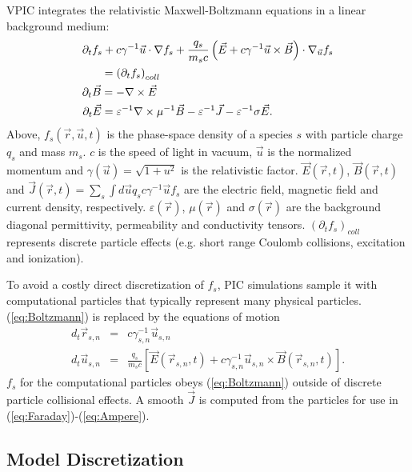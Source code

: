 \documentclass[journal,twoside]{IEEEtran}
\newcommand{\eps}{\varepsilon}
\newcommand{\vecr}{\vec{r}}
\newcommand{\vecu}{\vec{u}}
\newcommand{\vecJ}{\vec{J}}
\newcommand{\vecE}{\vec{E}}
\newcommand{\vecB}{\vec{B}}
\newcommand{\Deriv}[2]{d_{#2}#1}
\newcommand{\PDeriv}[2]{\partial_{#2}#1}
\newcommand{\DotP}[2]{#1 \cdot #2}
\newcommand{\CrossP}[2]{#1 \times #2}
\newcommand{\Grad}[1]{\nabla #1}
\newcommand{\Curl}[1]{\nabla \times #1}
\newcommand{\Gradu}[1]{\nabla_{\vecu} #1}
\newcommand{\eq}[1]{(\ref{eq:#1})}
\begin{document}
VPIC integrates the relativistic Maxwell-Boltzmann equations in a
linear background medium:
\begin{eqnarray}
\PDeriv{f_s}{t} + 
\DotP{c\gamma^{-1}\vecu}{\Grad{f_s}} +
\DotP{\frac{q_s}{m_s c}\left(\vecE+\CrossP{c\gamma^{-1}\vecu}{\vecB}\right)}
{\Gradu{f_s}}\nonumber&\\
= \left(\PDeriv{f_s}{t}\right)_{coll}\label{eq:Boltzmann}
\hspace{2.14in}&\\
\PDeriv{\vecB}{t} = -\Curl{\vecE} \label{eq:Faraday}
\hspace{2.18in}&\\
\PDeriv{\vecE}{t} =
\eps^{-1}\Curl{\mu^{-1}\vecB} - \eps^{-1}\vecJ - \eps^{-1}\sigma\vecE.
\label{eq:Ampere}
\hspace{0.75in}&
\end{eqnarray}
Above, $f_s\left(\vecr,\vecu,t\right)$ is the phase-space density of a
species $s$ with particle charge $q_s$ and mass $m_s$.  $c$ is the
speed of light in vacuum, $\vecu$ is the normalized momentum and
$\gamma\left(\vecu\right) = \sqrt{1 + u^2}$ is the relativistic
factor.  $\vecE\left(\vecr,t\right)$, $\vecB\left(\vecr,t\right)$ and
$\vecJ\left(\vecr,t\right) = \sum_s \int d\vecu q_s c\gamma^{-1}\vecu
f_s$ are the electric field, magnetic field and current density, respectively.
$\eps\left(\vecr\right)$, $\mu\left(\vecr\right)$ and
$\sigma\left(\vecr\right)$ are the background diagonal permittivity,
permeability and conductivity tensors.
$\left(\PDeriv{f_s}{t}\right)_{coll}$ represents discrete particle
effects (e.g. short range Coulomb collisions, excitation and
ionization).

To avoid a costly direct discretization of $f_s$, PIC simulations
sample it with computational particles that typically represent many
physical particles.  \eq{Boltzmann} is replaced by the equations of
motion
\begin{eqnarray}
\Deriv{\vecr_{s,n}}{t} &=& c \gamma_{s,n}^{-1} \vecu_{s,n} \label{eq:Position}\\
\Deriv{\vecu_{s,n}}{t} &=& \frac{q_s}{m_s c} \left[
\vecE\left(\vecr_{s,n},t\right) +
\CrossP{c\gamma_{s,n}^{-1}\vecu_{s,n}}{\vecB\left(\vecr_{s,n},t\right)}
\right] \label{eq:Momentum}
.
\end{eqnarray}
$f_s$ for the computational particles obeys \eq{Boltzmann} outside of
discrete particle collisional effects.  A smooth $\vecJ$ is computed
from the particles for use in \eq{Faraday}-\eq{Ampere}.

\subsection{Model Discretization}
\end{document}
